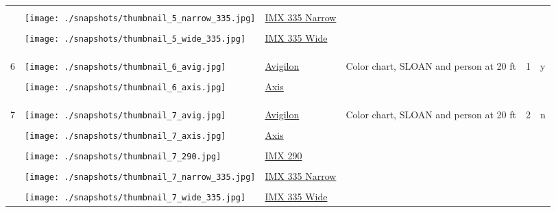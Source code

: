 \documentclass{article}%
\begin{document}
\begin{longtabu}{m{2.5cm} m{4cm} m{2cm} m{4cm} m{2cm} m{2cm}}
&&&&&\\%
&\texttt{[image: ./snapshots/thumbnail\_5\_narrow\_335.jpg]}&\href{https://drive.google.com/file/d/1MQ62ueWGeNSn5hTgv0Cb9bHy7E15cG4s/view?usp=sharing}{IMX 335 Narrow}&&&\\%
&&&&&\\%
&\texttt{[image: ./snapshots/thumbnail\_5\_wide\_335.jpg]}&\href{https://drive.google.com/file/d/1J57Q7X3TEIUolCkM8lYnVRJPfiJJ7LMx/view?usp=sharing}{IMX 335 Wide}&&&\\%
&&&&&\\%
&&&&&\\%
\hline%
&&&&&\\%
6&\texttt{[image: ./snapshots/thumbnail\_6\_avig.jpg]}&\href{https://drive.google.com/file/d/1-unNIZgpA4LrxhFTv3yI0XTs4Ums2sXT/view?usp=sharing}{Avigilon}&Color chart, SLOAN and person at 20 ft&1&y\\%
&&&&&\\%
&\texttt{[image: ./snapshots/thumbnail\_6\_axis.jpg]}&\href{https://drive.google.com/file/d/18wdWWZ1hZeuV-ki4ZMS3tXETaytrt_8T/view?usp=sharing}{Axis}&&&\\%
&&&&&\\%
&&&&&\\%
\hline%
&&&&&\\%
7&\texttt{[image: ./snapshots/thumbnail\_7\_avig.jpg]}&\href{https://drive.google.com/file/d/1qptludf_UZIqGHxItrbNUXgCzhPPumvX/view?usp=sharing}{Avigilon}&Color chart, SLOAN and person at 20 ft&2&n\\%
&&&&&\\%
&\texttt{[image: ./snapshots/thumbnail\_7\_axis.jpg]}&\href{https://drive.google.com/file/d/1f8RQPy_FFPnRBtsRk0pm2fEskeGoM7Ch/view?usp=sharing}{Axis}&&&\\%
&&&&&\\%
&\texttt{[image: ./snapshots/thumbnail\_7\_290.jpg]}&\href{https://drive.google.com/file/d/1kxk21TfAbRHpIF3kIF0k_iZfc-TPDjNU/view?usp=sharing}{IMX 290}&&&\\%
&&&&&\\%
&\texttt{[image: ./snapshots/thumbnail\_7\_narrow\_335.jpg]}&\href{https://drive.google.com/file/d/1OTPJ0HS0eiPVacBwNbepHquzjVpoiMlu/view?usp=sharing}{IMX 335 Narrow}&&&\\%
&&&&&\\%
&\texttt{[image: ./snapshots/thumbnail\_7\_wide\_335.jpg]}&\href{https://drive.google.com/file/d/11lUd81R7js5HzBBaUpF55w-e0aK8BDvh/view?usp=sharing}{IMX 335 Wide}&&&\\%

\end{longtabu}
\end{document}
